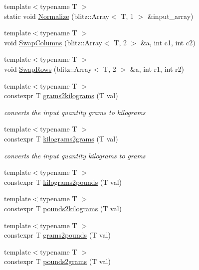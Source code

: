 \begin{DoxyCompactItemize}
\item 
{\footnotesize template$<$typename T $>$ }\\static void \mbox{\hyperlink{namespacempc_1_1utilities_a2b888b4e5d7d4fe16a1c97c120d0494f}{Normalize}} (blitz\+::\+Array$<$ T, 1 $>$ \&input\+\_\+array)
\item 
{\footnotesize template$<$typename T $>$ }\\void \mbox{\hyperlink{namespacempc_1_1utilities_a86772b476b0e0aa1567f42c8a9aa7a3c}{Swap\+Columns}} (blitz\+::\+Array$<$ T, 2 $>$ \&a, int c1, int c2)
\item 
{\footnotesize template$<$typename T $>$ }\\void \mbox{\hyperlink{namespacempc_1_1utilities_a7dc82dae028a331f955ec8a5aa3599a4}{Swap\+Rows}} (blitz\+::\+Array$<$ T, 2 $>$ \&a, int r1, int r2)
\item 
{\footnotesize template$<$typename T $>$ }\\constexpr T \mbox{\hyperlink{namespacempc_1_1utilities_ae61a687e707b0a0e951881d3f56c0e99}{grams2kilograms}} (T val)
\begin{DoxyCompactList}\small\item\em converts the input quantity grams to kilograms \end{DoxyCompactList}\item 
{\footnotesize template$<$typename T $>$ }\\constexpr T \mbox{\hyperlink{namespacempc_1_1utilities_ae04157378455df2cf7b5c7e1df0f0b73}{kilograms2grams}} (T val)
\begin{DoxyCompactList}\small\item\em converts the input quantity kilograms to grams \end{DoxyCompactList}\item 
{\footnotesize template$<$typename T $>$ }\\constexpr T \mbox{\hyperlink{namespacempc_1_1utilities_a2aba7ace8ddd90e43d4532cc3decc7d3}{kilograms2pounds}} (T val)
\item 
{\footnotesize template$<$typename T $>$ }\\constexpr T \mbox{\hyperlink{namespacempc_1_1utilities_a2c2a93627483d29fb5ecaa11be521680}{pounds2kilograms}} (T val)
\item 
{\footnotesize template$<$typename T $>$ }\\constexpr T \mbox{\hyperlink{namespacempc_1_1utilities_aaee66b89101ea36ef03bb9b8d4e7e4f1}{grams2pounds}} (T val)
\item 
{\footnotesize template$<$typename T $>$ }\\constexpr T \mbox{\hyperlink{namespacempc_1_1utilities_acf64151746ffeb74a8a8889d9c4dfd1e}{pounds2grams}} (T val)

\end{DoxyCompactItemize}

